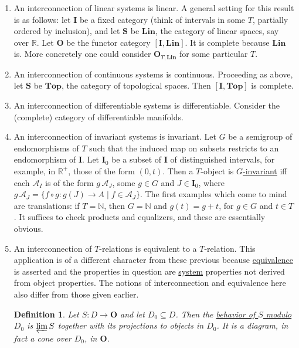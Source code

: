 \documentclass[10pt,a4paper,twocolumn]{article}
\newtheorem*{definition*}{Definition}
\newcommand{\A}{\mathcal{A}}          %
\newcommand{\Ocat}{\mathbf{O}}          %
\newcommand{\Scat}{\mathbf{S}}          %
\newcommand{\Iset}{\mathbf{I}}          %
\newcommand{\R}{\mathbb{R}}
\newcommand{\Rpos}{\R^{+}}
\newcommand{\origpage}[1]{%
  \marginpar{\raggedright\footnotesize\itshape p.~#1}%
}
\begin{document}
\begin{enumerate}
  \item An interconnection of linear systems is linear.
  A general setting for this result is as follows: let $\Iset$ be a fixed category (think of intervals in some $T$, partially ordered by inclusion), and let $\Scat$ be $\mathbf{Lin}$, the category of linear spaces, say over $\R$.
  Let $\Ocat$ be the functor category $[\Iset,\mathbf{Lin}]$.
  It is complete because $\mathbf{Lin}$ is.
  More concretely one could consider $\Ocat_{T,\mathbf{Lin}}$ for some particular $T$.

  \item An interconnection of continuous systems is continuous.
  Proceeding as above, let $\Scat$ be $\mathbf{Top}$, the category of topological spaces.
  Then $[\Iset,\mathbf{Top}]$ is complete.

  \item An interconnection of differentiable systems is differentiable.
  Consider the (complete) category of differentiable manifolds.

  \item An interconnection of invariant systems is invariant.
  Let $G$ be a semigroup of endomorphisms of $T$ such that the induced map on subsets restricts to an endomorphism of $\Iset$.
  Let $\Iset_{0}$ be a subset of $\Iset$ of distinguished intervals, for example, in $\Rpos$, those of the form $(0,t)$.
  Then a $T$-object is \underline{$G$-invariant} iff each $\A_{I}$ is of the form $g\,\A_{J}$, some $g\in G$ and $J\in\Iset_{0}$, where $g\,\A_{J} = \{f\circ g \colon g(J)\to A \mid f\in\A_{J}\}$.
  The first examples which come to mind are\origpage{130} translations: if $T=\mathbb{N}$, then $G=\mathbb{N}$ and $g(t)=g+t$, for $g\in G$ and $t\in T$.
  It suffices to check products and equalizers, and these are essentially obvious.

  \item An interconnection of $T$-relations is equivalent to a $T$-relation.
  This application is of a different character from these previous because \underline{equivalence} is asserted and the properties in question are \underline{system} properties not derived from object properties.
  The notions of interconnection and equivalence here also differ from those given earlier.

  \begin{definition*}
    Let $S\colon D\to\Ocat$ and let $D_{0}\subseteq D$.
    Then the \underline{behavior of $S$ modulo $D_{0}$} is $\varprojlim S$ together with its projections to objects in $D_{0}$.
    It is a diagram, in fact a cone over $D_{0}$, in $\Ocat$.
  \end{definition*}


\end{enumerate}
\end{document}
